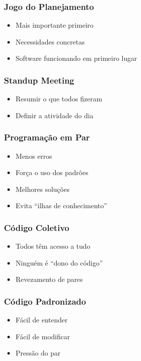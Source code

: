 \documentclass[10pt]{beamer}
\begin{document}
\begin{frame}
  \frametitle{Jogo do Planejamento}
  \begin{itemize}
  \item Mais importante primeiro
  \item Necessidades concretas
  \item Software funcionando em primeiro lugar
  \end{itemize}
\end{frame}

\begin{frame}
  \frametitle{Standup Meeting}
  \begin{itemize}
  \item Resumir o que todos fizeram
  \item Definir a atividade do dia
  \end{itemize}
\end{frame}

\begin{frame}
  \frametitle{Programação em Par}
  \begin{itemize}
  \item Menos erros
  \item Força o uso dos padrões
  \item Melhores soluções
  \item Evita ``ilhas de conhecimento''
  \end{itemize}
\end{frame}

\begin{frame}
  \frametitle{Código Coletivo}
  \begin{itemize}
  \item Todos têm acesso a tudo
  \item Ninguém é ``dono do código''
  \item Revezamento de pares
  \end{itemize}
\end{frame}

\begin{frame}
  \frametitle{Código Padronizado}
  \begin{itemize}
  \item Fácil de entender
  \item Fácil de modificar
  \item Pressão do par
  \end{itemize}
\end{frame}
\end{document}
